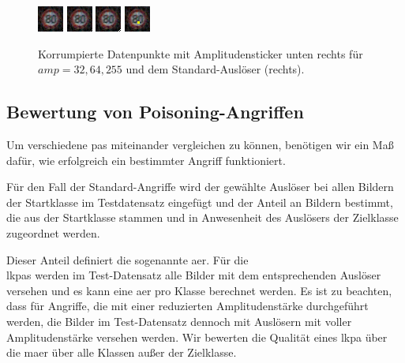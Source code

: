 \documentclass[twoside, 12pt,a4paper]{book}
\numberwithin{equation}{section}
\begin{document}
	
	\begin{figure}[ht]
		\centering
		\includegraphics[width=0.1\textheight]{32_1corner_infty300.jpeg}
		\includegraphics[width=0.1\textheight]{64_1_coner:infty300.jpeg}
		\includegraphics[width=0.1\textheight]{255_1corner_infty300.jpeg}		\includegraphics[width=0.1\textheight]{sticker_infty300.jpeg}
		\caption[Korrumpierte Datenpunkte für Label-konsistente Poisoning-Angriffe]{Korrumpierte Datenpunkte mit Amplitudensticker unten rechts für $amp=32,64,255$ und dem Standard-Auslöser (rechts).}
		
		\label{im:LCPA}
	\end{figure}


	
	
	\subsection{Bewertung von Poisoning-Angriffen}
	Um verschiedene \acp{pa} miteinander vergleichen zu können, benötigen wir ein Maß dafür, wie erfolgreich ein bestimmter Angriff funktioniert. 
	
	\noindent Für den Fall der Standard-Angriffe wird der gewählte Auslöser bei allen Bildern der Startklasse im Testdatensatz eingefügt und der Anteil an Bildern bestimmt, die aus der Startklasse stammen und in Anwesenheit des Auslösers der Zielklasse zugeordnet werden.
	
	\noindent Dieser Anteil definiert die sogenannte \acf{aer}. Für die \\ \noindent \acp{lkpa} werden im Test-Datensatz alle Bilder mit
	dem entsprechenden Auslöser versehen und es kann eine \ac{aer} pro Klasse
	berechnet werden. Es ist zu beachten, dass für Angriffe, die mit einer reduzierten
	Amplitudenstärke durchgeführt werden, die Bilder im Test-Datensatz dennoch mit
	Auslösern mit voller Amplitudenstärke versehen werden. Wir bewerten die Qualität
	eines \ac{lkpa} über die \ac{maer} über alle Klassen außer der Zielklasse.
 	
\end{document}
